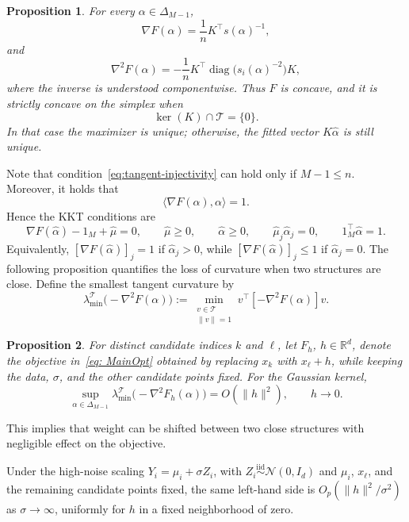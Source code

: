 \documentclass[12pt]{iopart}
\newtheorem{prop}{Proposition}
\theoremstyle{remark}
\begin{document}
\begin{prop}
\label{prop: GradHessKKT}
For every $\alpha\in\Delta_{M-1}$,
\[
\nabla F(\alpha)=\frac1nK^\top s(\alpha)^{-1},
\]
and
\begin{equation}
\label{eq: Hess}
\nabla^2F(\alpha)
=-\frac1nK^\top\operatorname{diag}\!\big(s_i(\alpha)^{-2}\big)K,
\end{equation}
where the inverse is understood componentwise. Thus $F$ is concave, and it is strictly
concave on the simplex when
\begin{equation}
\label{eq:tangent-injectivity}
\ker(K)\cap\mathcal T=\{0\}.
\end{equation}
In that case the maximizer is unique; otherwise, the fitted vector
$K\hat\alpha$ is still unique.
\end{prop}
Note that condition~\eqref{eq:tangent-injectivity} can hold only if $M-1\leq n$. Moreover, it holds that
\begin{equation}
\label{eq:gradient-simplex-identity}
\langle\nabla F(\alpha),\alpha\rangle
=1.
\end{equation}
Hence the KKT conditions are
\begin{equation}
\label{eq: KKT}
\nabla F(\hat\alpha)-1_M+\hat\mu=0, 
\qquad \hat\mu\geq0,
\qquad \hat\alpha\geq0,
\qquad \hat\mu_j\hat\alpha_j=0,
\qquad 1_M^\top\hat\alpha=1.
\end{equation}
Equivalently, $[\nabla F(\hat\alpha)]_j=1$ if $\hat\alpha_j>0$, while $[\nabla F(\hat\alpha)]_j\leq1$ if $\hat\alpha_j=0$.
The following proposition quantifies the loss of curvature when two structures are close. Define the smallest tangent curvature by
\[
\lambda_{\min}^{\mathcal T}\!\bigl(-\nabla^2F(\alpha)\bigr)
:=
\min_{\substack{v\in\mathcal T\\ \|v\|=1}}
v^\top[-\nabla^2F(\alpha)]v.
\]

\begin{prop}
\label{prop: IllCond}
For distinct candidate indices $k$ and $\ell$, let $F_h$, $h\in\mathbb R^d$,
denote the objective in~\eqref{eq: MainOpt} obtained by replacing $x_k$ with
$x_\ell+h$, while keeping the data, $\sigma$, and the other candidate points
fixed. For the Gaussian kernel,
\[
\sup_{\alpha\in\Delta_{M-1}}
\lambda_{\min}^{\mathcal T}\!\bigl(-\nabla^2F_h(\alpha)\bigr)
=O(\|h\|^2),
\qquad h\to0.
\]
\end{prop}
This implies that weight can be shifted between two close structures with negligible
effect on the objective.

Under the high-noise scaling $Y_i=\mu_i+\sigma Z_i$, with
$Z_i\stackrel{\mathrm{iid}}{\sim}\mathcal N(0,I_d)$ and $\mu_i$, $x_\ell$,
and the remaining candidate points fixed, the same left-hand side is
$O_p(\|h\|^2/\sigma^2)$ as $\sigma\to\infty$, uniformly for $h$ in a fixed
neighborhood of zero. 
\end{document}
